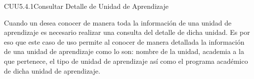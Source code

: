 \begin{UseCase}{CUU5.4.1}{Consultar Detalle de Unidad de Aprendizaje}
	{
		Cuando un  desea conocer de manera toda la información de una unidad de aprendizaje es necesario realizar una consulta del detalle de dicha unidad. Es por eso que este caso de uso permite al  conocer de manera detallada  la información de una unidad de aprendizaje como lo son: nombre de la unidad, academia a la que pertenece, el tipo de unidad de aprendizaje así como el programa académico de dicha unidad de aprendizaje. 
			
		}
		
		
		

\end{UseCase}
